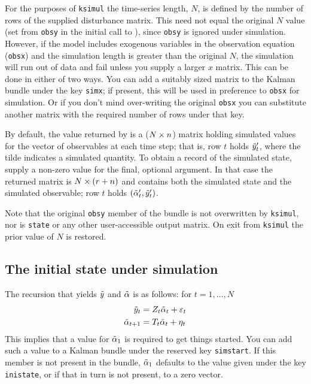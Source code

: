For the purposes of \texttt{ksimul} the time-series length, $N$, is
defined by the number of rows of the supplied disturbance matrix. This
need not equal the original $N$ value (set from \texttt{obsy} in the
initial call to ), since \texttt{obsy} is ignored under
simulation. However, if the model includes exogenous variables in the
observation equation (\texttt{obsx}) and the simulation length is
greater than the original $N$, the simulation will run out of data and
fail unless you supply a larger $x$ matrix.  This can be done in
either of two ways. You can add a suitably sized matrix to the Kalman
bundle under the key \texttt{simx}; if present, this will be used in
preference to \texttt{obsx} for simulation. Or if you don't mind
over-writing the original \texttt{obsx} you can substitute another
matrix with the required number of rows under that key.

By default, the value returned by  is a
($N \times n$) matrix holding simulated values for the vector of
observables at each time step; that is, row $t$ holds
$\tilde{y}_t'$, where the tilde indicates a simulated quantity.
To obtain a record of the simulated state, supply a non-zero value for
the final, optional argument. In that case the returned matrix is
$N \times (r + n)$ and contains both the simulated state
and the simulated observable; row $t$ holds
$(\tilde{\alpha}_t', \tilde{y}_t')$.

Note that the original \texttt{obsy} member of the bundle is not
overwritten by \texttt{ksimul}, nor is \texttt{state} or any other
user-accessible output matrix. On exit from \texttt{ksimul} the prior
value of $N$ is restored.

\subsection{The initial state under simulation}

The recursion that yields $\tilde{y}$ and $\tilde{\alpha}$
is as follows: for $t=1,\dots,N$
%
\begin{align*}
  \tilde{y}_t &= Z_t \tilde{\alpha}_t + \varepsilon_t  \\
  \tilde{\alpha}_{t+1} &= T_t \tilde{\alpha}_t + \eta_t
\end{align*}
%
This implies that a value for $\tilde{\alpha}_1$ is required to get
things started. You can add such a value to a Kalman bundle under the
reserved key \texttt{simstart}. If this member is not present in the
bundle, $\tilde{\alpha}_1$ defaults to the value given under the
key \texttt{inistate}, or if that in turn is not present, to a zero
vector.

